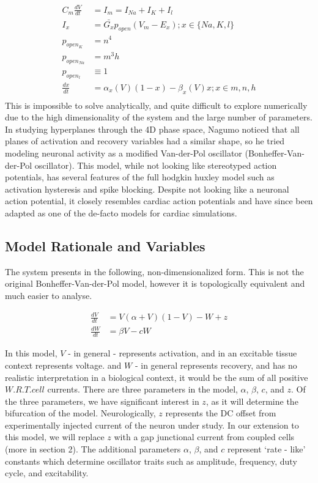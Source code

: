 \documentclass[11pt]{article}
\begin{document}
\begin{align}
C_m \frac{dV}{dt} &= I_m = I_{Na} + I_{K} + I_l \\
I_x &= \bar{G_x}p_{open}(V_m-E_x); x\in\{Na,K,l\}\\
p_{open_{K}} &= n^4\\
p_{open_{Na}} &= m^3h\\
p_{open_{l}} &\equiv 1\\
\frac{dx}{dt} &= \alpha_x(V)(1-x)-\beta_x(V)x; x\in{m,n,h}\\
\end{align}
This is impossible to solve analytically, and quite difficult to explore numerically due to the high dimensionality of the system and the large number of parameters. In studying hyperplanes through the 4D phase space, Nagumo noticed that all planes of activation and recovery variables had a similar shape, so he tried modeling neuronal activity as a modified Van-der-Pol oscillator (Bonheffer-Van-der-Pol oscillator). This model, while not looking like stereotyped action potentials, has several features of the full hodgkin huxley model such as activation hysteresis and spike blocking. Despite not looking like a neuronal action potential, it closely resembles cardiac action potentials and have since been adapted as one of the de-facto models for cardiac simulations. 


\subsection{Model Rationale and Variables}

The system presents in the following, non-dimensionalized form. This is not the original Bonheffer-Van-der-Pol model, however it is topologically equivalent and much easier to analyse.

\begin{align} \frac{dV}{dt} &= V(\alpha+V)(1-V) -W + z \\
\frac{dW}{dt} &= \beta V-cW \end{align}

In this model, $V$ - in general - represents activation, and in an excitable tissue context represents voltage. and $W$ - in general represents recovery, and has no realistic interpretation in a biological context, it would be the sum of all positive \( W.R.T. cell \) currents. There are three parameters in the model, $\alpha$, $\beta$, $c$, and $z$. Of the three parameters, we have significant interest in $z$, as it will determine the bifurcation of the model. Neurologically, $z$ represents the DC offset from experimentally injected current of the neuron under study. In our extension to this model, we will replace $z$ with a gap junctional current from coupled cells (more in section 2). The additional parameters $\alpha$, $\beta$, and $c$ represent `rate - like' constants which determine oscillator traits such as amplitude, frequency, duty cycle, and excitability.
\end{document}
